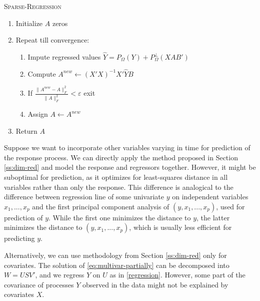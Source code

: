 \documentclass[preprint]{imsart}
\numberwithin{equation}{section}
\theoremstyle{plain}
\begin{document}
\begin{algorithm}
\caption{\textsc{Sparse-Regression}\label{alg:longitudinal-regression}}
\vspace{3pt}
\begin{enumerate}
\item Initialize $A$ zeros
\item Repeat till convergence:
\begin{enumerate}
\item Impute regressed values $\hat{Y} = P_\Omega(Y) + P_\Omega^\perp(XAB')$
\item Compute $A^{new} \leftarrow (X'X)^{-1} X'\hat{Y}B$
\item If $\frac{\|A^{new} - A\|_F^2}{\|A\|_F^2} < \varepsilon$ exit
\item Assign $A \leftarrow A^{new}$
\end{enumerate}
\item Return $A$
\end{enumerate}
\end{algorithm}


Suppose we want to incorporate other variables varying in time for prediction of the response process. We can directly apply the method proposed in Section \ref{ss:dim-red} and model the response and regressors together. However, it might be suboptimal for prediction, as it optimizes for least-squares distance in all variables rather than only the response. This difference is analogical to the difference between regression line of some univariate $y$ on independent variables $x_1,...,x_p$ and the first principal component analysis of $(y,x_1,...,x_p)$, used for prediction of $y$. While the first one minimizes the distance to $y$, the latter minimizes the distance to $(y,x_1,...,x_p)$, which is usually less efficient for predicting $y$.

Alternatively, we can use methodology from Section \ref{ss:dim-red} only for covariates. The solution of \eqref{eq:multivar-partially} can be decomposed into $W = USV'$, and we regress $Y$ on $U$ as in \eqref{regression}. However, some part of the covariance of processes $Y$ observed in the data might not be explained by covariates $X$. 

\end{document}
